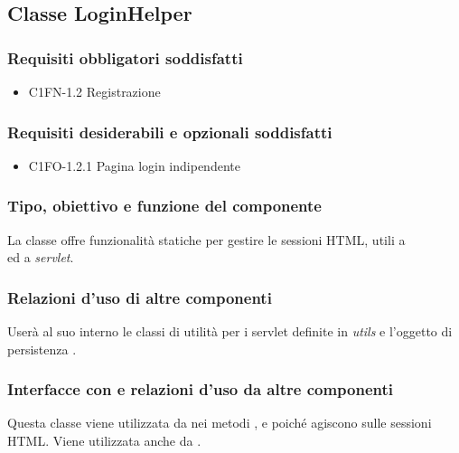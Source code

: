 \subsection{Classe LoginHelper}
\subsubsection*{Requisiti obbligatori soddisfatti}
\begin{itemize}
    \item C1FN-1.2 Registrazione
\end{itemize}
\subsubsection*{Requisiti desiderabili e opzionali soddisfatti}
\begin{itemize}
    \item C1FO-1.2.1 Pagina login indipendente
\end{itemize}
\subsubsection*{Tipo, obiettivo e funzione del componente}
La classe  offre funzionalit\`a statiche
per gestire le sessioni HTML, utili a\\  ed a
\emph{servlet}.
\subsubsection*{Relazioni d'uso di altre componenti}
User\`a al suo interno le classi di utilit\`a per i servlet definite in
\emph{utils} e l'oggetto di persistenza .
\subsubsection*{Interfacce con e relazioni d'uso da altre componenti}
Questa classe viene utilizzata da  nei metodi ,
 e  poich\'e agiscono sulle sessioni HTML.
Viene utilizzata anche da .
